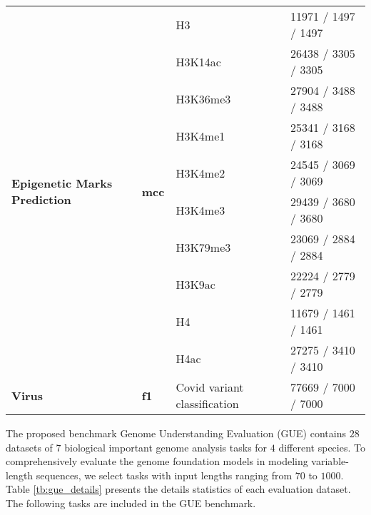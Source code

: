 \documentclass{article}
\begin{document}
\begin{table*}[h]
{\begin{tabular}{llll}
	\midrule

\multirow{10}{*}{\textbf{Epigenetic Marks Prediction}} & \multirow{10}{*}{\textbf{mcc}} 
        & H3  & 11971 / 1497 / 1497 \\
	&& H3K14ac  & 26438 / 3305 / 3305 \\
	&& H3K36me3  & 27904 / 3488 / 3488 \\
        && H3K4me1 & 25341 / 3168 / 3168 \\
        && H3K4me2  & 24545 / 3069 / 3069 \\
        && H3K4me3  & 29439 / 3680 / 3680 \\
	&& H3K79me3  & 23069 / 2884 / 2884 \\
	&& H3K9ac  & 22224 / 2779 / 2779 \\
        && H4 & 11679 / 1461 / 1461 \\
        && H4ac  & 27275 / 3410 / 3410 \\
	
	\midrule

\textbf{Virus}
        & \textbf{f1}
        & Covid variant classification & 77669 / 7000 / 7000 \\
	 

		\bottomrule
	\end{tabular}}
	\caption{ \footnotesize  
		Statistics of tasks in the GUE benchmark, including the name and the number of training, validation, and test samples in each dataset.
	}\label{tb:gue_details}
\end{table*}


The proposed benchmark Genome Understanding Evaluation (GUE) contains $28$ datasets of $7$ biological important genome analysis tasks for $4$ different species. To comprehensively evaluate the genome foundation models in modeling variable-length sequences, we select tasks with input lengths ranging from $70$ to $1000$. Table \ref{tb:gue_details} presents the details statistics of each evaluation dataset. The following tasks are included in the GUE benchmark.
\end{document}
